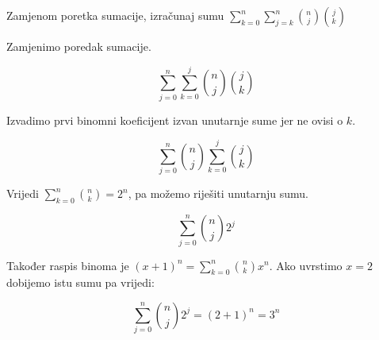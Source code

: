 \documentclass[exam.tex]{subfiles}
\begin{document}
	\begin{task}
		Zamjenom poretka sumacije, izračunaj sumu \( \displaystyle \sum\limits^n_{k=0} \sum\limits^n_{j=k} \binom{n}{j} \binom{j}{k} \) \\[1em]
	\end{task}
	
	Zamjenimo poredak sumacije.
	
	\[ \sum\limits^n_{j=0} \sum\limits^j_{k=0} \binom{n}{j} \binom{j}{k} \]
	
	Izvadimo prvi binomni koeficijent izvan unutarnje sume jer ne ovisi o \( k \).
	
	\[ \sum\limits^n_{j=0} \binom{n}{j} \sum\limits^j_{k=0} \binom{j}{k} \]
	
	Vrijedi \( \displaystyle \sum\limits^n_{k=0} \binom{n}{k} = 2^n \), pa možemo riješiti unutarnju sumu.
	
	\[ \sum\limits^n_{j=0} \binom{n}{j} 2^j \]
	
	Također raspis binoma je \( \displaystyle (x + 1)^n = \sum\limits^n_{k=0} \binom{n}{k} x^n \). Ako uvrstimo \( x = 2 \) dobijemo istu sumu pa vrijedi:
	
	\[ \sum\limits^n_{j=0} \binom{n}{j} 2^j = (2 + 1)^n = 3^n \]
\end{document}
